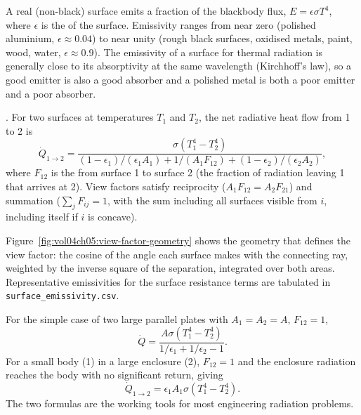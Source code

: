 A real (non-black) surface emits a fraction of the blackbody flux,
$E = \epsilon \sigma T^4$, where $\epsilon$ is the
 of the surface. Emissivity ranges from near
zero (polished aluminium, $\epsilon \approx 0.04$) to near unity
(rough black surfaces, oxidised metals, paint, wood, water, $\epsilon
\approx 0.9$). The emissivity of a surface for thermal radiation is
generally close to its absorptivity at the same wavelength (Kirchhoff's
law), so a good emitter is also a good absorber and a polished
metal is both a poor emitter and a poor absorber.

. For two
surfaces at temperatures $T_1$ and $T_2$, the net radiative heat
flow from 1 to 2 is
\[
\dot{Q}_{1 \to 2} = \frac{\sigma (T_1^4 - T_2^4)}{(1 - \epsilon_1)/(
\epsilon_1 A_1) + 1/(A_1 F_{12}) + (1 - \epsilon_2)/(\epsilon_2 A_2)},
\]
where $F_{12}$ is the  from surface 1 to surface
2 (the fraction of radiation leaving 1 that arrives at 2). View
factors satisfy reciprocity ($A_1 F_{12} = A_2 F_{21}$) and
summation ($\sum_j F_{ij} = 1$, with the sum including all surfaces
visible from $i$, including itself if $i$ is concave).



Figure~\ref{fig:vol04ch05:view-factor-geometry} shows the geometry that
defines the view factor: the cosine of the angle each surface makes with
the connecting ray, weighted by the inverse square of the separation,
integrated over both areas. Representative emissivities for the surface
resistance terms are tabulated in \texttt{surface\_emissivity.csv}.

For the simple case of two large parallel plates with $A_1 = A_2 = A$,
$F_{12} = 1$,
\[
\dot{Q} = \frac{A \sigma (T_1^4 - T_2^4)}{1/\epsilon_1 + 1/\epsilon_2
- 1}.
\]
For a small body (1) in a large enclosure (2), $F_{12} = 1$ and the
enclosure radiation reaches the body with no significant return,
giving
\[
\dot{Q}_{1 \to 2} = \epsilon_1 A_1 \sigma (T_1^4 - T_2^4).
\]
The two formulas are the working tools for most engineering radiation
problems.

